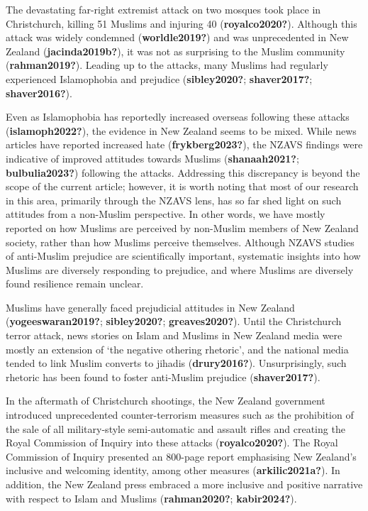 \documentclass[
]{interact}
\begin{document}
The devastating far-right extremist attack on two mosques took place in
Christchurch, killing 51 Muslims and injuring 40
(\textbf{royalco2020?}). Although this attack was widely condemned
(\textbf{worldle2019?}) and was unprecedented in New Zealand
(\textbf{jacinda2019b?}), it was not as surprising to the Muslim
community (\textbf{rahman2019?}). Leading up to the attacks, many
Muslims had regularly experienced Islamophobia and prejudice
(\textbf{sibley2020?}; \textbf{shaver2017?}; \textbf{shaver2016?}).

Even as Islamophobia has reportedly increased overseas following these
attacks (\textbf{islamoph2022?}), the evidence in New Zealand seems to
be mixed. While news articles have reported increased hate
(\textbf{frykberg2023?}), the NZAVS findings were indicative of improved
attitudes towards Muslims (\textbf{shanaah2021?};
\textbf{bulbulia2023?}) following the attacks. Addressing this
discrepancy is beyond the scope of the current article; however, it is
worth noting that most of our research in this area, primarily through
the NZAVS lens, has so far shed light on such attitudes from a
non-Muslim perspective. In other words, we have mostly reported on how
Muslims are perceived by non-Muslim members of New Zealand society,
rather than how Muslims perceive themselves. Although NZAVS studies of
anti-Muslim prejudice are scientifically important, systematic insights
into how Muslims are diversely responding to prejudice, and where
Muslims are diversely found resilience remain unclear.

Muslims have generally faced prejudicial attitudes in New Zealand
(\textbf{yogeeswaran2019?}; \textbf{sibley2020?};
\textbf{greaves2020?}). Until the Christchurch terror attack, news
stories on Islam and Muslims in New Zealand media were mostly an
extension of `the negative othering rhetoric', and the national media
tended to link Muslim converts to jihadis (\textbf{drury2016?}).
Unsurprisingly, such rhetoric has been found to foster anti-Muslim
prejudice (\textbf{shaver2017?}).

In the aftermath of Christchurch shootings, the New Zealand government
introduced unprecedented counter-terrorism measures such as the
prohibition of the sale of all military-style semi-automatic and assault
rifles and creating the Royal Commission of Inquiry into these attacks
(\textbf{royalco2020?}). The Royal Commission of Inquiry presented an
800-page report emphasising New Zealand's inclusive and welcoming
identity, among other measures (\textbf{arkilic2021a?}). In addition,
the New Zealand press embraced a more inclusive and positive narrative
with respect to Islam and Muslims (\textbf{rahman2020?};
\textbf{kabir2024?}).
\end{document}
